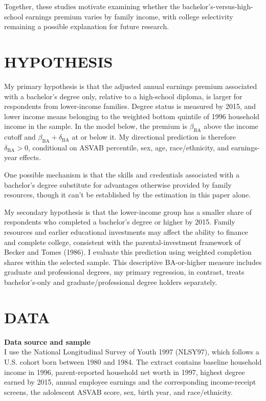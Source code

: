 \documentclass[12pt,letterpaper]{article}
\begin{document}
Together, these studies motivate examining whether the bachelor’s-versus-high-school 
earnings premium varies by family income, with college selectivity remaining a possible
 explanation for future research.

\section*{HYPOTHESIS}
My primary hypothesis is that the adjusted annual earnings premium associated with
a bachelor's degree only, relative to a high-school diploma, is larger for respondents
from lower-income families. Degree status is measured by 2015, and lower income
means belonging to the weighted bottom quintile of 1996 household income in the sample. 
In the model below, the premium is $\beta_{\mathrm{BA}}$ above the
income cutoff and $\beta_{\mathrm{BA}}+\delta_{\mathrm{BA}}$ at or below it.
My directional prediction is therefore $\delta_{\mathrm{BA}}>0$,
conditional on ASVAB percentile, sex, age, race/ethnicity, and earnings-year effects.\newline

One possible mechanism is that the skills and credentials associated with a
bachelor's degree substitute for advantages otherwise provided by family resources, 
though it can't be established by the estimation in this paper alone. \newline

My secondary hypothesis is that the lower-income group has a smaller share of
respondents who completed a bachelor's degree or higher by 2015. Family resources
and earlier educational investments may affect the ability to finance and complete
college, consistent with the parental-investment framework of Becker and Tomes
(1986). I evaluate this prediction using weighted completion shares within the
selected sample. This descriptive BA-or-higher measure includes graduate and
professional degrees, my primary regression, in contrast, treats bachelor's-only and
graduate/professional degree holders separately.\newline

\section*{DATA}
\textbf{Data source and sample}\\
I use the National Longitudinal Survey of Youth 1997 (NLSY97), which follows a
U.S. cohort born between 1980 and 1984. The extract contains baseline household
income in 1996, parent-reported household net worth in 1997, highest degree earned
by 2015, annual employee earnings and the corresponding income-receipt screens,
the adolescent ASVAB score, sex, birth year, and race/ethnicity.\newline
\end{document}
